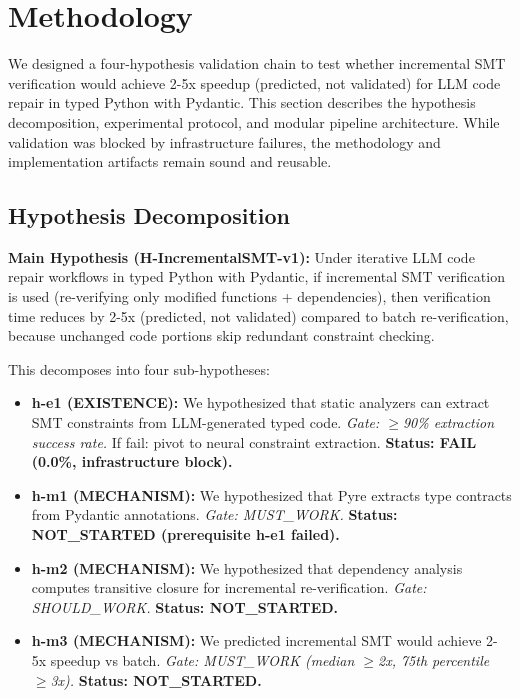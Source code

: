 \section{Methodology}

We designed a four-hypothesis validation chain to test whether incremental SMT verification would achieve 2-5x speedup (predicted, not validated) for LLM code repair in typed Python with Pydantic. This section describes the hypothesis decomposition, experimental protocol, and modular pipeline architecture. While validation was blocked by infrastructure failures, the methodology and implementation artifacts remain sound and reusable.

\subsection{Hypothesis Decomposition}

\textbf{Main Hypothesis (H-IncrementalSMT-v1):} Under iterative LLM code repair workflows in typed Python with Pydantic, if incremental SMT verification is used (re-verifying only modified functions + dependencies), then verification time reduces by 2-5x (predicted, not validated) compared to batch re-verification, because unchanged code portions skip redundant constraint checking.

This decomposes into four sub-hypotheses:

\begin{itemize}
\item \textbf{h-e1 (EXISTENCE):} We hypothesized that static analyzers can extract SMT constraints from LLM-generated typed code. \emph{Gate: $\geq$90\% extraction success rate.} If fail: pivot to neural constraint extraction. \textbf{Status: FAIL (0.0\%, infrastructure block).}

\item \textbf{h-m1 (MECHANISM):} We hypothesized that Pyre extracts type contracts from Pydantic annotations. \emph{Gate: MUST\_WORK.} \textbf{Status: NOT\_STARTED (prerequisite h-e1 failed).}

\item \textbf{h-m2 (MECHANISM):} We hypothesized that dependency analysis computes transitive closure for incremental re-verification. \emph{Gate: SHOULD\_WORK.} \textbf{Status: NOT\_STARTED.}

\item \textbf{h-m3 (MECHANISM):} We predicted incremental SMT would achieve 2-5x speedup vs batch. \emph{Gate: MUST\_WORK (median $\geq$2x, 75th percentile $\geq$3x).} \textbf{Status: NOT\_STARTED.}
\end{itemize}

